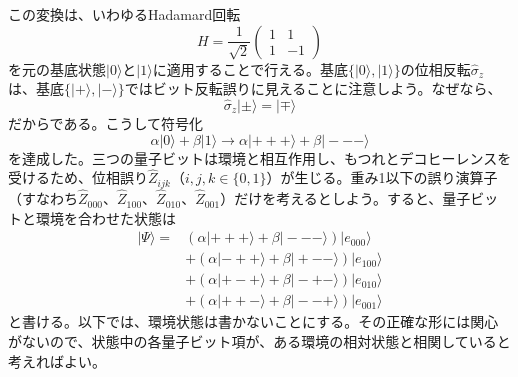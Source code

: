 \hypertarget{srcpage:317}{}\label{srcpage:317}
この変換は、いわゆるHadamard回転
\begin{equation}H=\frac1{\sqrt2}\begin{pmatrix}1&1\\1&-1\end{pmatrix}\tag{7.40}\end{equation}
を元の基底状態$|0\rangle$と$|1\rangle$に適用することで行える。基底$\{|0\rangle,|1\rangle\}$の位相反転$\hat\sigma_z$は、基底$\{|+\rangle,|-\rangle\}$ではビット反転誤りに見えることに注意しよう。なぜなら、
\begin{equation}\hat\sigma_z|\pm\rangle=|\mp\rangle\tag{7.41}\end{equation}
だからである。こうして符号化
\begin{equation}\alpha|0\rangle+\beta|1\rangle\longrightarrow\alpha|+++\rangle+\beta|---\rangle\tag{7.42}\end{equation}
を達成した。三つの量子ビットは環境と相互作用し、もつれとデコヒーレンスを受けるため、位相誤り$\hat Z_{ijk}$（$i,j,k\in\{0,1\}$）が生じる。重み1以下の誤り演算子（すなわち$\hat Z_{000}$、$\hat Z_{100}$、$\hat Z_{010}$、$\hat Z_{001}$）だけを考えるとしよう。すると、量子ビットと環境を合わせた状態は
\begin{equation}\begin{aligned}|\Psi\rangle={}&(\alpha|+++\rangle+\beta|---\rangle)|e_{000}\rangle\\&+(\alpha|-++\rangle+\beta|+--\rangle)|e_{100}\rangle\\&+(\alpha|+-+\rangle+\beta|-+-\rangle)|e_{010}\rangle\\&+(\alpha|++-\rangle+\beta|--+\rangle)|e_{001}\rangle\end{aligned}\tag{7.43}\end{equation}
と書ける。以下では、環境状態は書かないことにする。その正確な形には関心がないので、状態中の各量子ビット項が、ある環境の相対状態と相関していると考えればよい。

